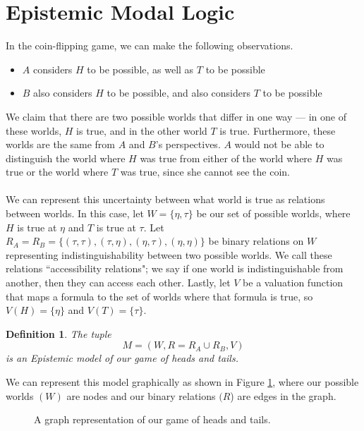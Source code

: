 \documentclass[12pt, a4paper, titlepage]{scrartcl}
\newtheorem{defn}{Definition}
\begin{document}
\section{Epistemic Modal Logic}\label{Epistemic}
In the coin-flipping game, we can make the following observations.
\begin{itemize}
	\item $A$ considers $H$ to be possible, as well as $T$ to be possible
	\item $B$ also considers $H$ to be possible, and also considers $T$ to be possible
\end{itemize}
We claim that there are two possible worlds that differ in one way ---
in one of these worlds, $H$ is true, and in the other world $T$ is true.
Furthermore, these worlds are the same from $A$ and $B$'s perspectives.
$A$ would not be able to distinguish the world where $H$ was true from either of
the world where $H$ was true or the world where $T$ was true, since she cannot
see the coin.\\
\\
We can represent this uncertainty between what world is true as relations
between worlds.
In this case, let $W = \{ \eta, \tau\}$ be our set of possible worlds, where $H$ is true
at $\eta$ and $T$ is true at $\tau$.
Let $R_A = R_B = \{(\tau,\tau), (\tau,\eta), (\eta, \tau), (\eta,\eta)\}$ be
binary relations on $W$ representing indistinguishability between two possible
worlds.
We call these relations ``accessibility relations"; we say if one world is
indistinguishable from another, then they can access each other.
Lastly, let $V$ be a valuation function that maps a formula to the set of worlds
where that formula is true, so $V(H) = \{\eta\}$ and $V(T) = \{\tau\}$.
\citep{hoek2008dynamic, blackburn2002modal}
\begin{defn}
	The tuple
	\[
		M = (W, R = R_A \cup R_B, V)
	\]
	is an Epistemic model of our game of heads and tails.
\end{defn}

We can represent this model graphically as shown in Figure \ref{htkripkefigure},
where our possible worlds $(W)$ are nodes and our binary relations $(R$) are edges in the
graph.
\begin{figure}[ht!]
\centering
{}
\caption{A graph representation of our game of heads and tails.}\label{htkripkefigure}
\end{figure}
\end{document}
